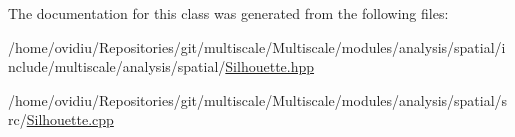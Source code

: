 The documentation for this class was generated from the following files\-:\begin{DoxyCompactItemize}
\item 
/home/ovidiu/\-Repositories/git/multiscale/\-Multiscale/modules/analysis/spatial/include/multiscale/analysis/spatial/\hyperlink{Silhouette_8hpp}{Silhouette.\-hpp}\item 
/home/ovidiu/\-Repositories/git/multiscale/\-Multiscale/modules/analysis/spatial/src/\hyperlink{Silhouette_8cpp}{Silhouette.\-cpp}\end{DoxyCompactItemize}
